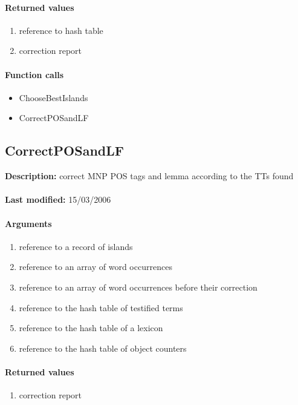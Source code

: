 \paragraph{Returned values}
\begin{enumerate}
\item reference to hash table
\item correction report
\end{enumerate}

\paragraph{Function calls}
\begin{itemize}
\item ChooseBestIslands
\item CorrectPOSandLF
\end{itemize}

\subsection{CorrectPOSandLF}
\textbf{Description:} correct MNP POS tags and lemma according to the TTs found\\
\\\textbf{Last modified:} 15/03/2006

\paragraph{Arguments}
\begin{enumerate}
\item reference to a record of islands
\item reference to an array of word occurrences
\item reference to an array of word occurrences before their correction
\item reference to the hash table of testified terms
\item reference to the hash table of a lexicon
\item reference to the hash table of object counters
\end{enumerate}

\paragraph{Returned values}
\begin{enumerate}
\item correction report
\end{enumerate}

